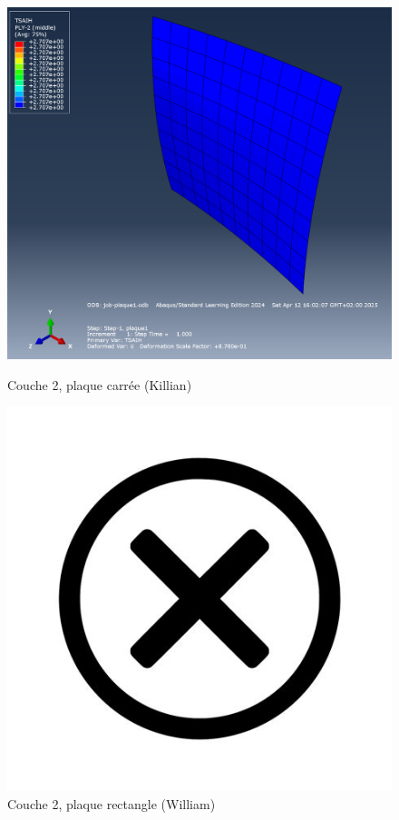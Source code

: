 \documentclass[a4paper,12pt]{article}
\begin{document}
\begin{figure}[h!]
	\centering
	\begin{minipage}[t][0.3\textheight]{0.495\textwidth}
		\centering
		\includegraphics[width=\textwidth]{media/K_P1_L2_12042025.png} %
		\caption{Couche 2, plaque carrée (Killian)}
		\label{fig:image1}
	\end{minipage}
	\hfill
	\begin{minipage}[t][0.3\textheight]{0.495\textwidth}
		\centering
		\includegraphics[width=\textwidth]{media/no-image.jpg} %
		\caption{Couche 2, plaque rectangle (William)}
		\label{fig:image2}
	\end{minipage}
\end{figure}
\clearpage
\end{document}
